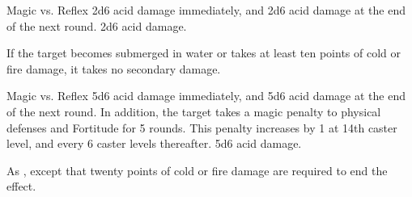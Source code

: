 \begin{spellheader}
\end{spellheader}
\begin{spelleffects}
    \begin{spellattack}{Magic vs. Reflex}
        \spellsuccess 2d6 acid damage immediately, and 2d6 acid damage at the end of the next round.
        \spellfailure 2d6 acid damage.
    \end{spellattack}
\end{spelleffects}
\begin{spellfooter}

    \spellnotes If the target becomes submerged in water or takes at least ten points of cold or fire damage, it takes no secondary damage.
\end{spellfooter}

\begin{spellheader}
\end{spellheader}
\begin{spelleffects}
    \begin{spellattack}{Magic vs. Reflex}
        \spellsuccess 5d6 acid damage immediately, and 5d6 acid damage at the end of the next round. In addition, the target takes a  magic penalty to physical defenses and Fortitude for 5 rounds. This penalty increases by 1 at 14th caster level, and every 6 caster levels thereafter.
        \spellfailure 5d6 acid damage.
    \end{spellattack}
\end{spelleffects}
\begin{spellfooter}
    \spellnotes As , except that twenty points of cold or fire damage are required to end the effect.
\end{spellfooter}

